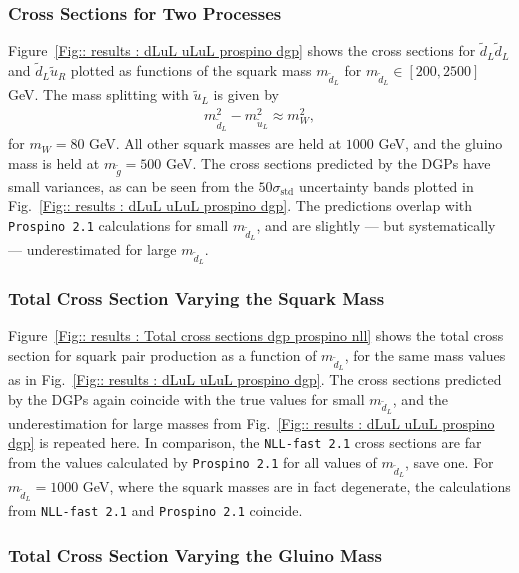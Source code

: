 \documentclass[twoside,english]{uiofysmaster}
\begin{document}
{\subsubsection{Cross Sections for Two Processes}
Figure~\ref{Fig:: results : dLuL uLuL prospino dgp} shows the cross sections for $\widetilde{d}_L \widetilde{d}_L$ and $\widetilde{d}_L \widetilde{u}_R$ plotted as functions of the squark mass $m_{\widetilde{d}_L}$ for $m_{\widetilde{d}_L}\in[200, 2500]$ GeV. The mass splitting with $\widetilde{u}_L$ is given by
\begin{align}
m_{\widetilde{d}_L}^2 - m_{\widetilde{u}_L}^2 \approx m_W^2,
\end{align}
for $m_W = 80$ GeV. All other squark masses are held at $1000$ GeV, and the gluino mass is held at $m_{\widetilde{g}} = 500$ GeV. The cross sections predicted by the DGPs have small variances, as can be seen from the $50 \sigma_{\mathrm{std}}$ uncertainty bands plotted in Fig.~\ref{Fig:: results : dLuL uLuL prospino dgp}. The predictions overlap with \verb|Prospino 2.1| calculations for small $m_{\widetilde{d}_L}$, and are slightly --- but systematically --- underestimated for large $m_{\widetilde{d}_L}$. 

\subsubsection{Total Cross Section Varying the Squark Mass}

Figure~\ref{Fig:: results : Total cross sections dgp prospino nll} shows the total cross section for squark pair production as a function of $m_{\widetilde{d}_L}$, for the same mass values as in Fig.~\ref{Fig:: results : dLuL uLuL prospino dgp}. The cross sections predicted by the DGPs again coincide with the true values for small $m_{\widetilde{d}_L}$, and the underestimation for large masses from Fig.~\ref{Fig:: results : dLuL uLuL prospino dgp} is repeated here. In comparison, the \verb|NLL-fast 2.1| cross sections are far from the values calculated by \verb|Prospino 2.1| for all values of $m_{\widetilde{d}_L}$, save one. For $m_{\widetilde{d}_L}=1000$ GeV, where the squark masses are in fact degenerate, the calculations from \verb|NLL-fast 2.1| and \verb|Prospino 2.1| coincide.  

\subsubsection{Total Cross Section Varying the Gluino Mass}

}
\end{document}
